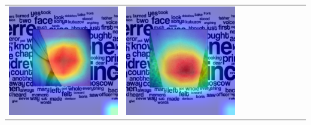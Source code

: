 \begin{landscape}
\begin{table}[]
\begin{tabular}{@{}c c c c c c c c c c@{}}
			\includegraphics[width=.12\textheight ,keepaspectratio]{images/pretraining/gradcam/3/EfficientNetB2CombinedGradCam.png} &
			\includegraphics[width=.12\textheight ,keepaspectratio]{images/pretraining/gradcam/9/EfficientNetB2CombinedGradCam.png}
			\\\cmidrule(lr){1-10}
			

\end{tabular}
\end{table}
\end{landscape}

